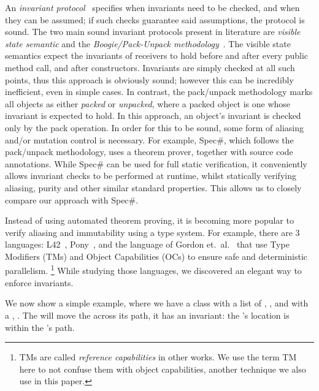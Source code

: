 An \emph{invariant protocol}~\cite{FlexibleInvariants} specifies when invariants need to be checked, and when they can be assumed; if such checks guarantee said assumptions, the protocol is sound.
The two main sound invariant protocols present in literature are \emph{visible state semantic} \cite{Meyer:1988:OSC:534929} and the \emph{Boogie/Pack-Unpack methodology}~\cite{DBLP:journals/jot/BarnettDFLS04}. The visible state semantics expect the invariants of receivers to hold before and after every public method call, and after constructors. Invariants are simply checked at all such points, thus this approach is obviously sound; however this can be incredibly inefficient, even in simple cases.
In contrast, the pack/unpack methodology marks all objects as either \emph{packed} or \emph{unpacked}, where a packed object is one whose invariant is expected to hold.
In this approach, an object's invariant is checked only by the pack operation.
In order for this to be sound, some form of aliasing and/or mutation control is necessary. For example, Spec\#, which follows the pack/unpack methodology, uses a theorem prover, together with source code annotations.
While Spec\# can be used for full static verification, it conveniently allows invariant checks to be performed
at runtime, 
whilst statically verifying aliasing, purity and other similar standard properties.
This allows us to closely compare our approach with Spec\#.

Instead of using automated theorem proving, 
it is becoming more popular to verify aliasing and immutability using a type system.
For example, there are 3 languages: L42~\cite{ServettoZucca15,ServettoEtAl13a,JOT:issue_2011_01/article1,GianniniEtAl16}, Pony~\cite{clebsch2015deny,clebsch2017orca}, and the language of Gordon et.~al.~\cite{GordonEtAl12} that use Type Modifiers (TMs) and Object Capabilities (OCs) to ensure safe and deterministic parallelism.%
\footnote{TMs are called \emph{reference capabilities} in other works. We use the term TM here
to not confuse them with object capabilities, another technique we also use in this paper.}
While studying those languages, we discovered an elegant way to enforce invariants.


We now show a simple example, where we have a \Q@Cage@ class with a list of \Q@Point@s, \Q@path@, and \Q@Hamster@ with a \Q@Point@, \Q@pos@. The \Q@Cage@ will move the \Q@Hamster@ across its path, it has an invariant: the \Q@Hamster@'s location is within the \Q@Cage@'s path.


